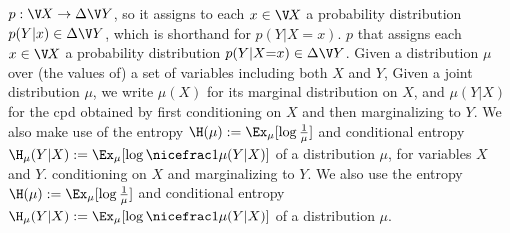 \ifvfull
$p : \V\mskip-1.5mu  X \to \Delta \V Y$, so it assigns to each $x \in \V\mskip-1.5mu X$ a
probability distribution 
$p(Y|x) \in \Delta \V Y$, which is shorthand for $p(Y|X{=}x)$.
\else
$p$ that assigns each $x \in \V\mskip-1.5mu X$ a probability distribution
$p(Y|X{=}x) \in \Delta \V Y$.
\fi
\ifvfull
Given a distribution $\mu$ over (the values of) a set of variables including both $X$ and $Y$,
\else
Given a joint distribution $\mu$,
\fi
we write $\mu(X)$ for its marginal distribution on $X$,
and $\mu(Y|X)$ for the cpd obtained by 
\ifvfull
first conditioning on $X$ and then marginalizing to $Y$.
We also make use of the entropy $\H(\mu) := \Ex_{\mu} [\log \frac1\mu]$ and conditional entropy $\H_\mu(Y|X) := \Ex_\mu[\log\nicefrac1{\mu(Y|X)}]$ of a distribution $\mu$,
for variables $X$ and $Y$.
\else
conditioning on $X$ and marginalizing to $Y$.
We also use the entropy $\H(\mu) := \Ex_{\mu} [\log \frac1\mu]$ and conditional entropy $\H_\mu(Y|X) := \Ex_\mu[\log\nicefrac1{\mu(Y|X)}]$ of a distribution $\mu$.
\fi




